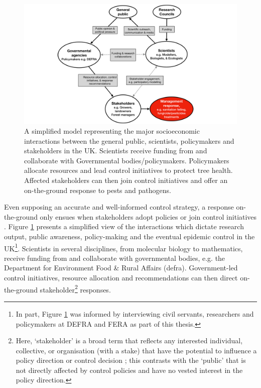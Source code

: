 \begin{figure}
    \centering
    \includegraphics[scale=0.35]{chapter1/figures/modelling-and-policy.pdf}
    \caption{A simplified model representing the major socioeconomic interactions between the general public, scientists, 
    policymakers and stakeholders in the UK. Scientists receive funding from and collaborate with Governmental bodies/policymakers. 
    Policymakers allocate resources and lead control initiatives to protect tree health. 
    Affected stakeholders can then join control initiatives and offer an on-the-ground response to pests and pathogens.}
    \label{fig:modelling-and-policies}
\end{figure}

Even supposing an accurate and well-informed control strategy,
a response on-the-ground only ensues when stakeholders adopt policies or join control initiatives \cite{reed2018theory}.
Figure \ref{fig:modelling-and-policies} presents a simplified view of the interactions which dictate research output, public awareness, 
policy-making and the eventual epidemic control in the UK\footnote{
In part, Figure \ref{fig:modelling-and-policies} was informed by interviewing civil servants, researchers and policymakers at DEFRA and FERA as part of this thesis.}. Scientists in several disciplines,
from molecular biology to mathematics, receive funding from and collaborate with governmental
bodies, e.g. the Department for Environment Food \& Rural Affairs (\acrshort{defra}). Government-led control initiatives, resource
allocation and recommendations can then direct on-the-ground stakeholder\footnote{Here, `stakeholder' is a broad
term that reflects any interested individual, collective, or organisation 
(with a stake) that have the potential to influence a policy direction or control decision
\cite{brugha2000stakeholder}; this contrasts with the `public' that is not directly affected by control policies and have no vested interest in the policy direction.} 
responses. 

